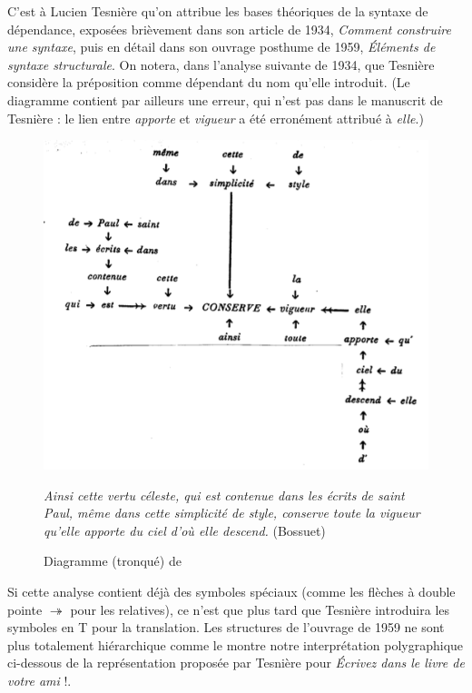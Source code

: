 {    C’est à Lucien Tesnière qu’on attribue les bases théoriques de la syntaxe de dépendance, exposées brièvement dans son article de 1934, \textit{Comment construire une syntaxe}, puis en détail dans son ouvrage posthume de 1959, \textit{Éléments de syntaxe structurale}. On notera, dans l’analyse suivante de 1934, que Tesnière considère la préposition comme dépendant du nom qu’elle introduit. (Le diagramme contient par ailleurs une erreur, qui n’est pas dans le manuscrit de Tesnière : le lien entre \textit{apporte} et \textit{vigueur} a été erronément attribué à \textit{elle}.)

    \begin{figure}
    \caption{Diagramme (tronqué) de \citet{tesniere1934comment}}
    \includegraphics[width=\textwidth]{figures/vol1syntaxe2-img017.png}\medskip\\
    \raggedright\textit{Ainsi cette vertu céleste, qui est contenue dans les écrits de saint Paul, même dans cette simplicité de style, conserve toute la vigueur qu’elle apporte du ciel d’où elle descend.} (Bossuet)
    \end{figure}

    Si cette analyse contient déjà des symboles spéciaux (comme les flèches à double pointe \textrm{$\twoheadrightarrow $} pour les relatives), ce n’est que plus tard que Tesnière introduira les symboles en T pour la translation. Les structures de l’ouvrage de 1959 ne sont plus totalement hiérarchique comme le montre notre interprétation polygraphique ci-dessous de la représentation proposée par Tesnière pour \textit{Écrivez dans le livre de votre ami} !.

}
